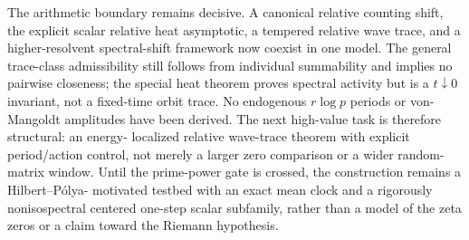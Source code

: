 The arithmetic boundary remains decisive.  A canonical relative counting
shift, the explicit scalar relative heat asymptotic, a tempered relative wave
trace, and a higher-resolvent spectral-shift framework now coexist in one
model.  The general trace-class admissibility still follows from individual
summability and implies no pairwise closeness; the special heat theorem proves
spectral activity but is a \(t\downarrow0\) invariant, not a fixed-time orbit
trace.  No endogenous \(r\log p\) periods or von-Mangoldt amplitudes have been
derived.  The next high-value task is therefore structural: an energy-
localized relative wave-trace theorem with explicit period/action control,
not merely a larger zero comparison or a wider random-matrix window.  Until
the prime-power gate is crossed, the construction remains a Hilbert--P\'olya-
motivated testbed with an exact mean clock and a rigorously nonisospectral
centered one-step scalar subfamily, rather than a model of the zeta zeros or
a claim toward the Riemann hypothesis.
